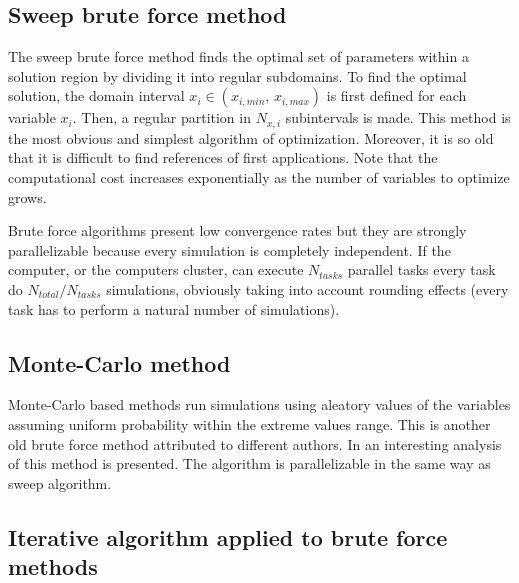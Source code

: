 \documentclass[review,authoryear]{elsarticle}
\newcommand{\PA}[1]{\left(#1\right)}
\begin{document}
\subsection{Sweep brute force method}

The sweep brute force method finds the optimal set of parameters within a solution region by dividing it into regular subdomains. To find the optimal solution, the domain interval $x_i \in \PA{x_{i,min},\,x_{i,max}}$ is first defined for each variable $x_i$. Then, a regular partition in  $N_{x,i}$ subintervals is made. This method is the most obvious and simplest algorithm of optimization. Moreover, it is so old that it is difficult to find references of first applications. Note that the computational cost increases exponentially as the number of variables to optimize grows.

Brute force algorithms present low convergence rates but they are strongly
parallelizable because every simulation is completely independent. If the
computer, or the computers cluster, can execute $N_{tasks}$ parallel tasks
every task do $N_{total}/N_{tasks}$ simulations, obviously taking into account
rounding effects (every task has to perform a natural number of simulations).

\subsection{Monte-Carlo method}

Monte-Carlo based methods run simulations using aleatory values of the
variables assuming uniform probability within the extreme values range. This is
another old brute force method attributed to different authors. In
\citet{AtanassovDimov08} an interesting analysis of this method is presented.
The algorithm is parallelizable in the same way as sweep algorithm.

\subsection{Iterative algorithm applied to brute force methods}
\end{document}
